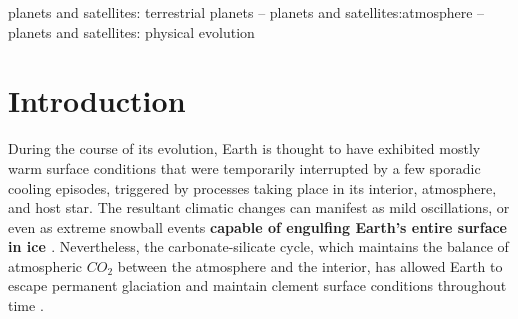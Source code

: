 \documentclass[fleqn,usenatbib]{mnras}
\providecommand{\DIFadd}[1]{{\bf #1}} %
\providecommand{\DIFdel}[1]{} %
\providecommand{\DIFaddbegin}{} %
\providecommand{\DIFaddend}{} %
\providecommand{\DIFdelbegin}{} %
\providecommand{\DIFdelend}{} %
\newcommand{\DIFscaledelfig}{0.5}
\newlength{\DIFdelgraphicswidth} %
\newlength{\DIFdelgraphicsheight} %
\newcommand{\DIFaddincludegraphics}[2][]{{\color{blue}\fbox{\DIFOincludegraphics[#1]{#2}}}} %
\newcommand{\DIFdelincludegraphics}[2][]{%
\sbox{\DIFdelgraphicsbox}{\DIFOincludegraphics[#1]{#2}}%
\settoboxwidth{\DIFdelgraphicswidth}{\DIFdelgraphicsbox} %
\settoboxtotalheight{\DIFdelgraphicsheight}{\DIFdelgraphicsbox} %
\scalebox{\DIFscaledelfig}{%
\parbox[b]{\DIFdelgraphicswidth}{\usebox{\DIFdelgraphicsbox}\\[-\baselineskip] \rule{\DIFdelgraphicswidth}{0em}}\llap{\resizebox{\DIFdelgraphicswidth}{\DIFdelgraphicsheight}{%
\setlength{\unitlength}{\DIFdelgraphicswidth}%
\begin{picture}(1,1)%
\thicklines\linethickness{2pt} %
{\color[rgb]{1,0,0}\put(0,0){\framebox(1,1){}}}%
{\color[rgb]{1,0,0}\put(0,0){\line( 1,1){1}}}%
{\color[rgb]{1,0,0}\put(0,1){\line(1,-1){1}}}%
\end{picture}%
}\hspace*{3pt}}} %
} %
\DeclareRobustCommand{\DIFaddbegin}{\DIFOaddbegin \let\includegraphics\DIFaddincludegraphics} %
\DeclareRobustCommand{\DIFaddend}{\DIFOaddend \let\includegraphics\DIFOincludegraphics} %
\DeclareRobustCommand{\DIFdelbegin}{\DIFOdelbegin \let\includegraphics\DIFdelincludegraphics} %
\DeclareRobustCommand{\DIFdelend}{\DIFOaddend \let\includegraphics\DIFOincludegraphics} %
\begin{document}
\begin{keywords}
planets and satellites: terrestrial planets -- planets and satellites:atmosphere -- planets and satellites: physical evolution
\end{keywords}



\section{Introduction}

During the course of its evolution, Earth is thought to have exhibited mostly warm surface conditions that were temporarily interrupted by a few sporadic cooling episodes, triggered by processes taking place in its interior, atmosphere, and host star. The resultant climatic changes can manifest as mild oscillations, or even as extreme snowball events \DIFdelbegin \DIFdel{\citep{kirschvink1992,Hoffman1342}, with Earth’s surface being completely covered in ice }\DIFdelend \DIFaddbegin \DIFadd{capable of engulfing Earth's entire surface in ice \citep{kirschvink1992,Hoffman1342}}\DIFaddend . Nevertheless, the carbonate-silicate cycle, which maintains the balance of atmospheric $CO_{\mathrm{2}}$ between the atmosphere and the interior, has allowed Earth to escape permanent glaciation and maintain clement surface conditions throughout time \citep{Hoffman1342}.
\end{document}
